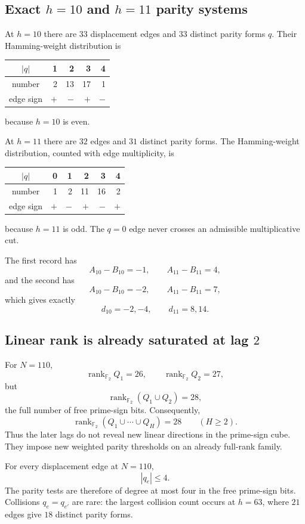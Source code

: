 \documentclass[11pt]{article}
\newcommand{\Ftwo}{\mathbb F_2}
\begin{document}
\subsection{Exact $h=10$ and $h=11$ parity systems}

At $h=10$ there are $33$ displacement edges and $33$ distinct parity forms $q$.  Their Hamming-weight distribution is
\begin{center}
\begin{tabular}{c|rrrr}
$|q|$&1&2&3&4\\
\hline
number&2&13&17&1\\
edge sign&$+$&$-$&$+$&$-$
\end{tabular}
\end{center}
because $h=10$ is even.

At $h=11$ there are $32$ edges and $31$ distinct parity forms.  The Hamming-weight distribution, counted with edge multiplicity, is
\begin{center}
\begin{tabular}{c|rrrrr}
$|q|$&0&1&2&3&4\\
\hline
number&1&2&11&16&2\\
edge sign&$+$&$-$&$+$&$-$&$+$
\end{tabular}
\end{center}
because $h=11$ is odd.  The $q=0$ edge never crosses an admissible multiplicative cut.

The first record has
\[
 A_{10}-B_{10}=-1,\qquad A_{11}-B_{11}=4,
\]
and the second has
\[
 A_{10}-B_{10}=-2,\qquad A_{11}-B_{11}=7,
\]
which gives exactly
\[
 d_{10}=-2,-4,\qquad d_{11}=8,14.
\]

\subsection{Linear rank is already saturated at lag $2$}

For $N=110$,
\[
 \operatorname{rank}_{\Ftwo}Q_1=26,\qquad
 \operatorname{rank}_{\Ftwo}Q_2=27,
\]
but
\[
 \boxed{
 \operatorname{rank}_{\Ftwo}(Q_1\cup Q_2)=28,
 }
\]
the full number of free prime-sign bits.  Consequently,
\[
 \operatorname{rank}_{\Ftwo}(Q_1\cup\cdots\cup Q_H)=28
 \qquad(H\ge2).
\]
Thus the later lags do not reveal new linear directions in the prime-sign cube.  They impose new weighted parity thresholds on an already full-rank family.

For every displacement edge at $N=110$,
\[
 \boxed{|q_e|\le4.}
\]
The parity tests are therefore of degree at most four in the free prime-sign bits.  Collisions $q_e=q_{e'}$ are rare: the largest collision count occurs at $h=63$, where $21$ edges give $18$ distinct parity forms.
\end{document}
